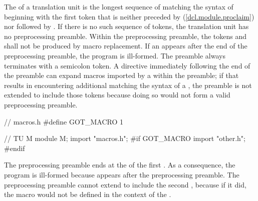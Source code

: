 \begin{after}
\begin{std.txt}
\color{addclr}
\alinea
The  of a translation unit is
the longest sequence of  matching
the syntax of 
beginning with the first  token that is
neither preceded by  (\ref{dcl.module.proclaim})
nor followed by \tcode{;}.
If there is no such sequence of tokens,
the translation unit has no preprocessing preamble.
Within the preprocessing preamble, the tokens  and 
shall not be produced by macro replacement.
If an  
appears after the end of the preprocessing preamble,
the program is ill-formed.
\enternote
The preamble always terminates with a semicolon token.
A  directive immediately following the end of the preamble
can expand macros imported by a  within the
preamble; if that results in encountering additional
 matching the syntax of a
, the preamble is not extended to include
those tokens because doing so would not form a valid preprocessing preamble.
\begin{example}
\begin{codeblock}
// macros.h
#define GOT_MACRO 1

// TU M
module M;
import "macros.h";
#if GOT_MACRO
import "other.h";
#endif
\end{codeblock}
The preprocessing preamble ends at the \tcode{;} of the first .
As a consequence, the program is ill-formed because 
appears after the preprocessing preamble.
The preprocessing preamble cannot extend to include the second ,
because if it did, the macro  would not be defined in the
context of the .
\end{example}
\exitnote
\end{std.txt}

\end{after}
